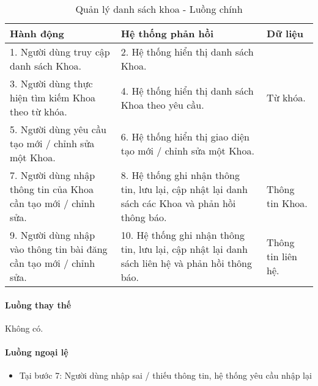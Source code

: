 \documentclass[./../main.tex]{subfiles}
\begin{document}
\begin{table}[H]
	\caption{Quản lý danh sách khoa - Luồng chính}
	\label{tab:admin_manage_orgs}
	\begin{tabularx}{\textwidth}{|X|X|X|}
		\hline
		\textbf{Hành động}                                                 & \textbf{Hệ thống phản hồi}                                                                      & \textbf{Dữ liệu}   \\ \hline
		1. Người dùng truy cập danh sách Khoa.                             & 2. Hệ thống hiển thị danh sách Khoa.                                                            &                    \\ \hline
		3. Người dùng thực hiện tìm kiếm Khoa theo từ khóa.                & 4. Hệ thống hiển thị danh sách Khoa theo yêu cầu.                                               & Từ khóa.           \\ \hline
		5. Người dùng yêu cầu tạo mới / chỉnh sửa một Khoa.                & 6. Hệ thống hiển thị giao diện tạo mới / chỉnh sửa một Khoa.                                    &                    \\ \hline
		7. Người dùng nhập thông tin của Khoa cần tạo mới / chỉnh sửa.     & 8. Hệ thống ghi nhận thông tin, lưu lại, cập nhật lại danh sách các Khoa và phản hồi thông báo. & Thông tin Khoa.    \\ \hline
		9. Người dùng nhập vào thông tin bài đăng cần tạo mới / chỉnh sửa. & 10. Hệ thống ghi nhận thông tin, lưu lại, cập nhật lại danh sách liên hệ và phản hồi thông báo. & Thông tin liên hệ. \\ \hline
	\end{tabularx}
\end{table}

\paragraph*{Luồng thay thế} Không có.

\paragraph*{Luồng ngoại lệ}

\begin{itemize}
	\item

	      Tại bước 7: Người dùng nhập sai / thiếu thông tin, hệ thống yêu cầu nhập lại

\end{itemize}
\end{document}
